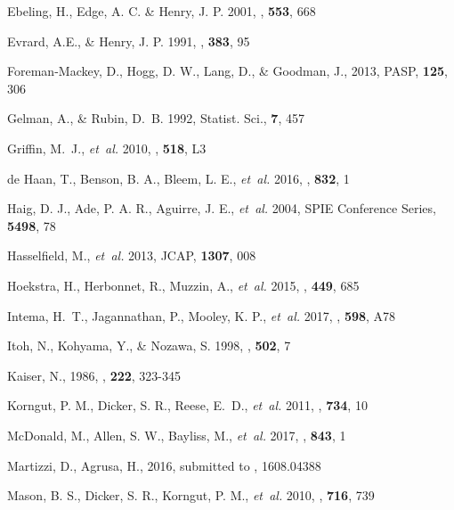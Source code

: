 \documentclass[traditabstract]{aa}
\begin{document}
\begin{thebibliography}{81}
{Ebeling}, H., {Edge}, A. C. \& {Henry}, J. P. 2001, \apj, \textbf{553}, 668

{Evrard}, A.E., \& {Henry}, J. P. 1991, \apj, \textbf{383}, 95

Foreman-Mackey, D., Hogg, D. W., Lang, D., \& Goodman, J., 2013, PASP, \textbf{125}, 306

Gelman, A., \& Rubin, D.~B. 1992, Statist. Sci., \textbf{7}, 457

Griffin, M.~J., \emph{et~al.} 2010, \aap, \textbf{518}, L3

{de Haan}, T., {Benson}, B. A., {Bleem}, L. E., \emph{et~al.} 2016, \apj, \textbf{832}, 1

Haig, D. J., Ade, P. A. R., Aguirre, J. E., \emph{et~al.} 2004, SPIE Conference Series, \textbf{5498}, 78

Hasselfield, M., \emph{et~al.} 2013, JCAP, \textbf{1307}, 008

{Hoekstra}, H., {Herbonnet}, R., {Muzzin}, A.,  \emph{et~al.} 2015, \mnras, \textbf{449}, 685

Intema, H.~T., Jagannathan, P., Mooley, K. P., \emph{et~al.} 2017, \aap, \textbf{598}, A78

Itoh, N., Kohyama, Y., \& Nozawa, S. 1998, \apj, \textbf{502}, 7

Kaiser, N., 1986, \mnras, \textbf{222}, 323-345

Korngut, P. M., Dicker, S. R., Reese, E.~D., \emph{et~al.} 2011, \apj, \textbf{734}, 10

{McDonald}, M., {Allen}, S. W., Bayliss, M., \emph{et~al.} 2017, \apj, \textbf{843}, 1

Martizzi, D., Agrusa, H., 2016, submitted to \mnras, 1608.04388

Mason, B. S., Dicker, S. R., Korngut, P. M., \emph{et~al.} 2010, \apj, \textbf{716}, 739


\end{thebibliography}
\end{document}
